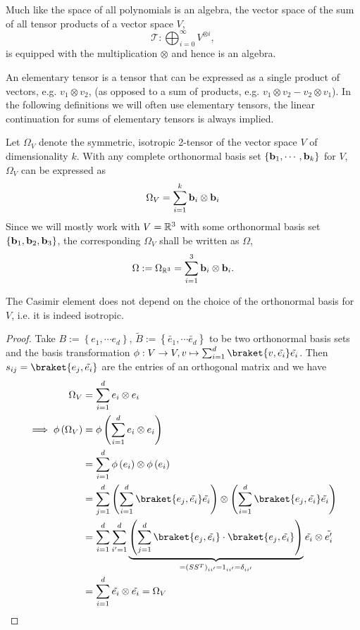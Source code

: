 \begin{remark}
	Much like the space of all polynomials is an algebra, the vector space of the sum of all tensor products of a vector space $V$,
	\[\mathcal{T}: \bigoplus_{i=0}^{\infty} V^{\otimes i},\]
	is equipped with the multiplication $\otimes$ and hence is an algebra.
\end{remark}

\begin{definition}
	An elementary tensor is a tensor that can be expressed as a single product of vectors, e.g. $v_1\otimes v_2 $, (as opposed to a sum of products, e.g. $v_1\otimes v_2 - v_2 \otimes v_1$). In the following definitions we will often use elementary tensors, the linear continuation for sums of elementary tensors is always implied.
\end{definition}

\begin{definition}
	Let $\Omega_V$ denote the symmetric, isotropic 2-tensor of the vector space $V$ of dimensionality $k$. With any complete orthonormal basis set $\{\mathbf{b}_1,\cdots,\mathbf{b}_k\}$ for $V$, $\Omega_V$ can be expressed as
	\begin{equation}
		\Omega_V = \sum_{i=1}^k \mathbf{b}_i \otimes \mathbf{b}_i
	\end{equation}
	Since we will mostly work with $V=\mathbb{R}^3$ with some orthonormal basis set $\{\mathbf{b}_1,\mathbf{b}_2,\mathbf{b}_3\}$, the corresponding $\Omega_V$ shall be written as $\Omega$,
	\[\Omega := \Omega_{\mathbb{R}^3} = \sum_{i=1}^3 \mathbf{b}_i \otimes \mathbf{b}_i.\]
\end{definition}
\begin{lemma}
	The Casimir element does not depend on the choice of the orthonormal basis for $V$, i.e. it is indeed isotropic.
\end{lemma}
\begin{proof}
	Take $B:=\left\{e_1, \cdots e_d\right\}$, $\tilde{B}:=\left\{\tilde{e_1}, \cdots \tilde{e_d}\right\}$ to be two orthonormal basis sets and the basis transformation $\phi:V\to V, v \mapsto \sum_{i=1}^{d}\braket{v,\tilde{e_i}}\tilde{e_i}$. Then $s_{ij}=\braket{e_j,\tilde{e_i}}$ are the entries of an orthogonal matrix and we have
	\begin{align*}
		\Omega_V &= \sum_{i=1}^d e_i \otimes e_i\\
		\implies \phi\left(\Omega_V\right) &= \phi\left(\sum_{i=1}^d e_i \otimes e_i\right)\\
		&= \sum_{i=1}^d \phi\left(e_i\right) \otimes \phi\left(e_i\right)\\
		&=\sum_{j=1}^d \left(\sum_{i=1}^d \braket{e_j,\tilde{e_i}}\tilde{e_i}\right) \otimes \left(\sum_{i=1}^d \braket{e_j,\tilde{e_i}}\tilde{e_i}\right) \\
		&=\sum_{i=1}^d\sum_{i'=1}^d\underbrace{\left(\sum_{j=1}^d \braket{e_j,\tilde{e_i}}\cdot\braket{e_j,\tilde{e_i}}\right)}_{=(SS^T)_{ii'}=1_{ii'}=\delta_{ii'}} \tilde{e_i}\otimes \tilde{e_i'} \\
		&=\sum_{i=1}^d\tilde{e_i}\otimes \tilde{e_i} = \Omega_V
	\end{align*}
\end{proof}

